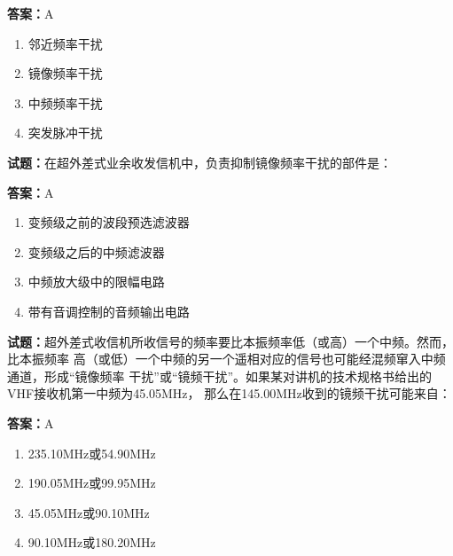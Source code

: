 \documentclass{ctexbook}
\begin{document}
\textbf{答案：}A 

\begin{enumerate}[leftmargin=3em]
  \item 邻近频率干扰 

  \item 镜像频率干扰 

  \item 中频频率干扰 

  \item 突发脉冲干扰 

\end{enumerate}





\vspace{1em}

\textbf{试题：}在超外差式业余收发信机中，负责抑制镜像频率干扰的部件是： 

\textbf{答案：}A 

\begin{enumerate}[leftmargin=3em]
  \item 变频级之前的波段预选滤波器 

  \item 变频级之后的中频滤波器 

  \item 中频放大级中的限幅电路 

  \item 带有音调控制的音频输出电路 

\end{enumerate}





\vspace{1em}

\textbf{试题：}超外差式收信机所收信号的频率要比本振频率低（或高）一个中频。然而，比本振频率
高（或低）一个中频的另一个遥相对应的信号也可能经混频窜入中频通道，形成“镜像频率
干扰”或“镜频干扰”。如果某对讲机的技术规格书给出的VHF接收机第一中频为45.05MHz，
那么在145.00MHz收到的镜频干扰可能来自： 

\textbf{答案：}A 

\begin{enumerate}[leftmargin=3em]
  \item 235.10MHz或54.90MHz 

  \item 190.05MHz或99.95MHz 

  \item 45.05MHz或90.10MHz 

  \item 90.10MHz或180.20MHz 

\end{enumerate}
\end{document}
